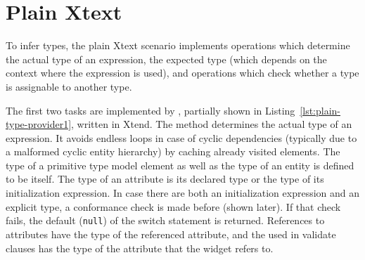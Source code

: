 \section{Plain Xtext}
\label{sec:plain-xtext}

To infer types, the plain Xtext scenario implements operations which determine
the actual type of an expression, the expected type (which depends on the
context where the expression is used), and operations which check whether a type
is assignable to another type.

The first two tasks are implemented by , partially
shown in Listing~\ref{lst:plain-type-provider1}, written in Xtend. The method
 determines the actual type of an expression. It avoids endless
loops in case of cyclic dependencies (typically due to a malformed cyclic entity
hierarchy) by caching already visited elements.  The type of a primitive type
model element as well as the type of an entity is defined to be itself. The type
of an attribute is its declared type or the type of its initialization
expression.  In case there are both an initialization expression and an explicit type, a
conformance check is made before (shown later). If that
check fails, the default (\verb|null|) of the switch statement is returned.
References to attributes have the type of the referenced attribute, and the
 used in validate clauses has the type of the attribute that
the widget refers to.


%

